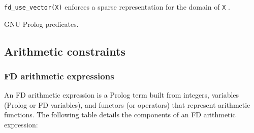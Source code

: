 \texttt{fd\_use\_vector(X)} enforces a sparse representation for the domain
of \texttt{X} .

\begin{PlErrors}



\end{PlErrors}

\Portability

GNU Prolog predicates.

\subsection{Arithmetic constraints}

\subsubsection{FD arithmetic expressions}
\label{FD-arithmetic-expressions}
An FD arithmetic expression is a Prolog term built from integers, variables
(Prolog or FD variables), and functors (or operators) that represent
arithmetic functions. The following table details the components of an FD
arithmetic expression:


